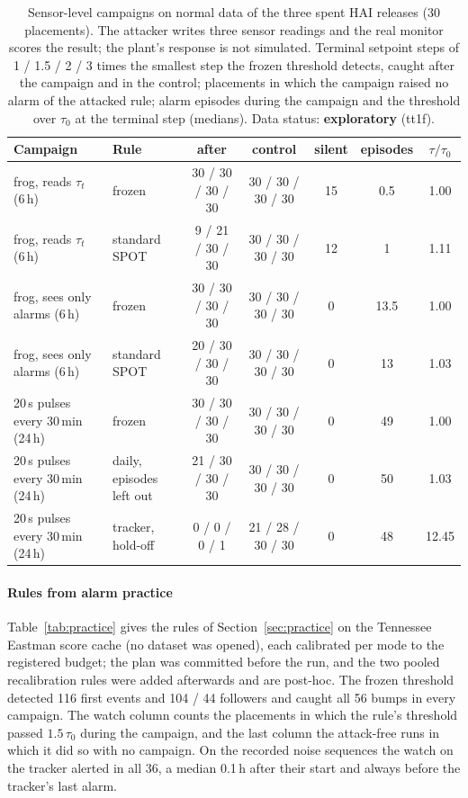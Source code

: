 \documentclass[letterpaper,twocolumn,10pt]{article}
\begin{document}
\begin{table}[t]
\caption{Sensor-level campaigns on normal data of the three spent HAI releases (30 placements). The attacker
writes three sensor readings and the real monitor scores the result; the plant's response is not
simulated. Terminal setpoint steps of 1 / 1.5 / 2 / 3 times the smallest step the frozen threshold detects,
caught after the campaign and in the control; placements in which the campaign raised no alarm of the
attacked rule; alarm episodes during the campaign and the threshold over $\tau_0$ at the terminal step
(medians). Data status: \textbf{exploratory} (tt1f).}
\label{tab:process}
\small
\begin{tabularx}{\textwidth}{@{}LLccccc@{}}
\toprule
Campaign & Rule & after & control & silent & episodes & $\tau/\tau_0$ \\
\midrule
frog, reads $\tau_t$ (6\,h) & frozen & 30 / 30 / 30 / 30 & 30 / 30 / 30 / 30 & 15 & 0.5 & 1.00 \\
frog, reads $\tau_t$ (6\,h) & standard SPOT & 9 / 21 / 30 / 30 & 30 / 30 / 30 / 30 & 12 & 1 & 1.11 \\
frog, sees only alarms (6\,h) & frozen & 30 / 30 / 30 / 30 & 30 / 30 / 30 / 30 & 0 & 13.5 & 1.00 \\
frog, sees only alarms (6\,h) & standard SPOT & 20 / 30 / 30 / 30 & 30 / 30 / 30 / 30 & 0 & 13 & 1.03 \\
20\,s pulses every 30\,min (24\,h) & frozen & 30 / 30 / 30 / 30 & 30 / 30 / 30 / 30 & 0 & 49 & 1.00 \\
20\,s pulses every 30\,min (24\,h) & daily, episodes left out & 21 / 30 / 30 / 30 & 30 / 30 / 30 / 30 & 0 & 50 & 1.03 \\
20\,s pulses every 30\,min (24\,h) & tracker, hold-off & 0 / 0 / 0 / 1 & 21 / 28 / 30 / 30 & 0 & 48 & 12.45 \\
\bottomrule
\end{tabularx}
\end{table}

\paragraph{Rules from alarm practice}
Table~\ref{tab:practice} gives the rules of Section~\ref{sec:practice} on the Tennessee Eastman score
cache (no dataset was opened), each calibrated per mode to the registered budget; the plan was committed
before the run, and the two pooled recalibration rules were added afterwards and are post-hoc. The frozen
threshold detected 116 first events and 104 / 44 followers and caught all 56 bumps in every campaign. The watch
column counts the placements in which the rule's threshold passed $1.5\,\tau_0$ during the campaign, and
the last column the attack-free runs in which it did so with no campaign. On the recorded noise sequences
the watch on the tracker alerted in all 36, a median 0.1\,h after their start and always before the
tracker's last alarm.
\end{document}
